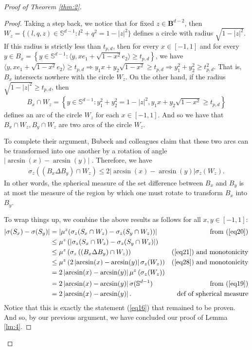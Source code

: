 \documentclass{article}
\begin{document}
\begin{proof}[Proof of Theorem \ref{thm:2}]
\begin{proof}
Taking a step back, we notice that for fixed $z \in \boldsymbol{B}^{d-2}$, then $W_z = \{ (l, q, z) \in \mathbb{S}^{d-1} : l^2 + q^2 = 1 - \left| z \right|^2 \}$ defines a circle with radius $\sqrt{1 - \left|z \right|^2}$. If this radius is strictly less than $t_{p,d}$, then for every $x \in [-1, 1]$ and for every $y \in B_x = \left\{ y \in \mathbb{S}^{d-1} : \langle y, xe_1 + \sqrt{1-x^2}e_2 \rangle \geq t_{p,d} \right\}$, we have  $\langle y, xe_1 + \sqrt{1-x^2}e_2 \rangle \geq t_{p,d} \Rightarrow y_1x + y_2\sqrt{1-x^2} \geq t_{p,d} \Rightarrow y_1^2 + y_2^2 \geq t_{p,d}^2$. That is, $B_x$ intersects nowhere with the circle $W_z$. On the other hand, if the radius $\sqrt{1 - \left|z \right|^2} \geq t_{p,d}$, then 
\begin{align*}
    B_x \cap W_z = \left\{ y \in \mathbb{S}^{d-1} : y_1^2 + y_2^2  = 1 - \left|z \right|^2, y_1x + y_2\sqrt{1-x^2} \geq t_{p,d} \right\}
\end{align*}
defines an arc of the circle $W_z$ for each $x \in [-1, 1]$.  And so we have that $B_x \cap W_z, B_y \cap W_z$ are two arcs of the circle $W_z$. 

To complete their argument, Bubeck and colleagues claim that these two arcs can be transformed into one another by a rotation of angle $\left| \arcsin(x) - \arcsin(y) \right|$ \cite{bubeck2016testing}.
Therefore, we have 
\begin{align}
    \sigma_z((B_x \Delta B_y) \cap W_z) \leq 2 \left| \arcsin(x) - \arcsin(y) \right| \sigma_z(W_z)\label{eq28}.
\end{align}
In other words, the spherical measure of the set difference between $B_x$ and $B_y$ is at most the measure of the region by which one must rotate to transform $B_x$ into $B_y$.

To wrap things up, we combine the above results as follows for all $x, y \in [-1, 1]$:
\begin{align*}
    \left|\sigma(S_x) - \sigma(S_y) \right| &= \left| \mu^z(\sigma_z(S_x \cap W_z) - \sigma_z(S_y \cap W_z)) \right| & \text{from (\ref{eq20})} \\
    &\leq \mu^z \left( \left| \sigma_z(S_x \cap W_z) - \sigma_z(S_y \cap W_z) \right| \right)\\
    &\leq \mu^z \left( \sigma_z \left((B_x \Delta B_y) \cap W_z \right) \right) & \text{(\ref{eq21}) and monotonicity}\\
    &\leq \mu^z \left( 2 \left| \arcsin(x) - \arcsin(y) \right| \sigma_z(W_z) \right) & \text{(\ref{eq28}) and monotonicity}\\
    &= 2 \left| \arcsin(x) - \arcsin(y) \right| \mu^z \left( \sigma_z(W_z) \right)\\
    &= 2 \left| \arcsin(x) - \arcsin(y) \right| \sigma(\mathbb{S}^{d-1})  & \text{from (\ref{eq19})}\\
    &= 2 \left| \arcsin(x) - \arcsin(y) \right|. & \text{def of spherical measure}
\end{align*}
Notice that this is exactly the statement (\ref{eq16}) that remained to be proven. And so, by our previous argument, we have concluded our proof of Lemma \ref{lm:4}.
\end{proof}


\end{proof}
\end{document}
